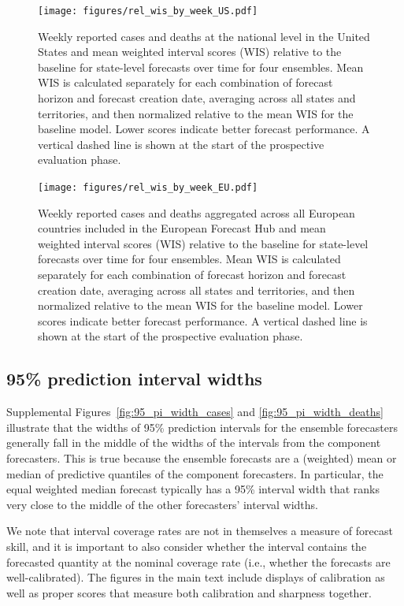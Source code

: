 \documentclass{article}
\begin{document}
\begin{figure}
  \texttt{[image: figures/rel\_wis\_by\_week\_US.pdf]}
  \caption{Weekly reported cases and deaths at the national level in the United States and mean weighted interval scores (WIS) relative to the baseline for state-level forecasts over time for four ensembles.
  Mean WIS is calculated separately for each combination of forecast horizon and forecast creation date, averaging across all states and territories, and then normalized relative to the mean WIS for the baseline model.
  Lower scores indicate better forecast performance.
  A vertical dashed line is shown at the start of the prospective evaluation phase.
  }
  \label{fig:rel_WIS_over_time_us}
\end{figure}

\begin{figure}
  \texttt{[image: figures/rel\_wis\_by\_week\_EU.pdf]}
  \caption{Weekly reported cases and deaths aggregated across all European countries included in the European Forecast Hub and mean weighted interval scores (WIS) relative to the baseline for state-level forecasts over time for four ensembles.
  Mean WIS is calculated separately for each combination of forecast horizon and forecast creation date, averaging across all states and territories, and then normalized relative to the mean WIS for the baseline model.
  Lower scores indicate better forecast performance.
  A vertical dashed line is shown at the start of the prospective evaluation phase.
}
  \label{fig:rel_WIS_over_time_euro}
\end{figure}

\newpage

\subsection{95\% prediction interval widths}

Supplemental Figures~\ref{fig:95_pi_width_cases} and \ref{fig:95_pi_width_deaths} illustrate that the widths of 95\% prediction intervals for the ensemble forecasters generally fall in the middle of the widths of the intervals from the component forecasters. This is true because the ensemble forecasts are a (weighted) mean or median of predictive quantiles of the component forecasters. In particular, the equal weighted median forecast typically has a 95\% interval width that ranks very close to the middle of the other forecasters' interval widths.

We note that interval coverage rates are not in themselves a measure of forecast skill, and it is important to also consider whether the interval contains the forecasted quantity at the nominal coverage rate (i.e., whether the forecasts are well-calibrated). The figures in the main text include displays of calibration as well as proper scores that measure both calibration and sharpness together.
\end{document}
